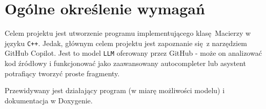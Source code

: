 	\newpage
\section{Ogólne określenie wymagań}		%

\hspace{0.60cm}

Celem projektu jest utworzenie programu implementującego klasę Macierzy w języku \texttt{C++}. Jedak, głównym celem projektu jest zapoznanie się z narzędziem GitHub Copilot. Jest to model \texttt{LLM} oferowany przez GitHub - może on analizować kod źródłowy i funkcjonować jako zaawansowany autocompleter lub asystent potrafiący tworzyć proste fragmenty.

Przewidywany jest działający program (w miarę możliwości modelu) i dokumentacja w Doxygenie.
